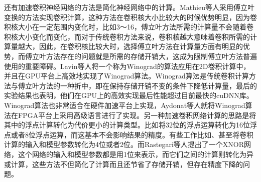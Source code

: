 还有加速卷积神经网络的方法是简化神经网络中的计算。Mathieu等人采用傅立叶变换的方法实现卷积计算，这种方法在卷积核大小比较大的时候优势明显，因为卷积核大小在一定范围内变化时，比如3～16，傅立叶方法所需的计算量不会随着卷积核大小变化而变化，而对于传统卷积方法来说，卷积核越大意味着卷积所需的计算量越大，因此，在卷积核比较大时，选择傅立叶方法在计算量方面有明显的优势，而傅立叶方法存在的问题就是所需的存储开销大，这成为限制傅立叶方法普遍使用的重要障碍。Lavin等人将一个称为Winograd的算法应用在2D卷积计算中，并且在GPU平台上高效地实现了Winograd算法。Winograd算法是传统卷积计算方法与傅立叶方法的一种折中，即在保持存储开销不变的条件下降低计算量，最后的实验结果也表明，他们在GPU上的高效实现最后性能超过目前最快的cuDNN库。Winograd算法也非常适合在硬件加速平台上实现，Aydonat等人就将Winograd算法在FPGA平台上采用高级语言进行了实现。另一种加速卷积网络计算的思路是将其中的浮点计算转化为代价更小的计算类型。比如将32位的浮点运算转化为16位浮点或者8位浮点运算，而这基本不会影响结果的精度。有些工作比如、甚至将卷积计算的输入和模型参数转化为4位或者2位。而Rastegari等人提出了一个XNOR网络，这个网络的输入和模型参数都是用1位来表示，而它们之间的计算则转化为异或计算，这些方法不但简化了计算而且还节省了存储开销，但存在精度下降的问题。

